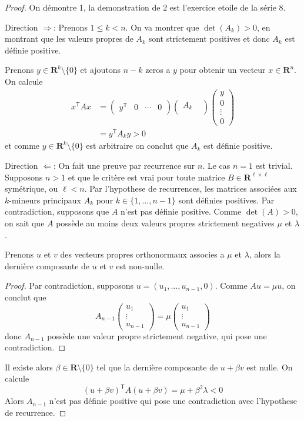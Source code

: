 \begin{proof}
On démontre 1, la demonstration de 2 est l'exercice etoile de la série 8.

Direction $\Rightarrow$: Prenons $1\le k<n$. On va montrer que $\det(A_{k})>0$, en montrant que les valeurs propres de $A_{k}$ sont strictement positives et donc $A_{k}$ est définie positive.

Prenons $y\in \mathbf{R}^{k}\setminus \{ 0 \}$ et ajoutons $n-k$ zeros a $y$ pour obtenir un vecteur $x \in \mathbf{R}^{n}$. On calcule 
\begin{align*}
x^{\mathsf{T}}Ax & =\begin{pmatrix}
y^{\mathsf{T}} &0  & \cdots  & 0 
\end{pmatrix}\begin{pmatrix}
A_{k} &  \\
 & 
\end{pmatrix} \begin{pmatrix}
y \\
0 \\
\vdots \\
0
\end{pmatrix} \\
 & =y^{\mathsf{T}}A_{k}y>0
\end{align*}
et comme $y\in \mathbf{R}^{k}\setminus \{ 0 \}$ est arbitraire on conclut que $A_{k}$ est définie positive.

Direction $\Leftarrow$: On fait une preuve par recurrence sur $n$. Le cas $n=1$ est trivial. Supposons $n>1$ et que le critère est vrai pour toute matrice $B\in\mathbf{R}^{\ell \times \ell}$ symétrique, ou $\ell<n$. Par l'hypothese de recurrences, les matrices associées aux $k$-mineurs principaux $A_{k}$ pour $k\in \{ 1,\dots,n-1 \}$ sont définies positives. Par contradiction, supposons que $A$ n'est pas définie positive. Comme $\det(A)>0$, on sait que $A$ possède au moins deux valeurs propres strictement negatives $\mu$ et $\lambda$. 
\begin{claim}
Prenons $u$ et $v$ des vecteurs propres orthonormaux associes a $\mu$ et $\lambda$, alors la dernière composante de $u$ et $v$ est non-nulle.
\end{claim}
\begin{proof}
Par contradiction, supposons $u=(u_{1},\dots,u_{n-1},0)$. Comme $Au=\mu u$, on conclut que $$A_{n-1}\begin{pmatrix}u_{1} \\ \vdots \\ u_{n-1}\end{pmatrix}=\mu \begin{pmatrix}u_{1} \\ \vdots \\ u_{n-1}\end{pmatrix}$$donc $A_{n-1}$ possède une valeur propre strictement negative, qui pose une contradiction.
\end{proof}
Il existe alors $\beta \in \mathbf{R}\setminus \{ 0 \}$ tel que la dernière composante de $u+\beta v$ est nulle. On calcule
$$
(u+\beta v)^{\mathsf{T}}A(u+\beta v) = \mu +\beta^{2}\lambda<0
$$
Alors $A_{n-1}$ n'est pas définie positive qui pose une contradiction avec l'hypothese de recurrence.
\end{proof}

